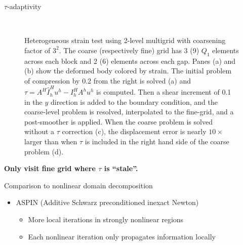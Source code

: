 \documentclass[final,t]{beamer}
\begin{document}
\begin{frame}{}
\begin{columns}
    \begin{column}{0.31\textwidth}
      \begin{block}{$\tau$-adaptivity}
        \begin{figure}
          \centering
           ~
           ~
           ~
          \caption{Heterogeneous strain test using 2-level multigrid with coarsening factor of $3^2$.
            The coarse (respectively fine) grid has 3 (9) $Q_1$ elements across each block and 2 (6) elements across each gap.
            Panes (a) and (b) show the deformed body colored by strain.
            The initial problem of compression by 0.2 from the right is solved (a) and $\tau = A^H \hat I_h^H u^h - I_h^H A^h u^h$ is computed.
            Then a shear increment of 0.1 in the $y$ direction is added to the boundary condition, and the coarse-level problem is resolved, interpolated to the fine-grid, and a post-smoother is applied.
            When the coarse problem is solved without a $\tau$ correction (c), the displacement error is nearly $10\times$ larger than when $\tau$ is included in the right hand side of the coarse problem (d).
          }\label{fig:tau-valid}
        \end{figure}
        \begin{center}
          {\LARGE \bf Only visit fine grid where $\tau$ is ``stale''. }
        \end{center}
      \end{block}
      \vspace{-2em}
      \begin{block}{Comparison to nonlinear domain decomposition}
        \begin{itemize}
        \item ASPIN (Additive Schwarz preconditioned inexact Newton) \cite{cai2003npi} \\
          \begin{itemize}
          \item More local iterations in strongly nonlinear regions
          \item Each nonlinear iteration only propagates information locally

\end{itemize}
\end{itemize}
\end{block}
\end{column}
\end{columns}
\end{frame}
\end{document}
